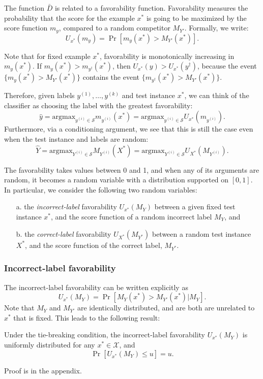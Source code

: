 \documentclass[twoside,11pt]{article}
\newcommand{\argmax}{\text{argmax}}
\begin{document}
The function $\bar{D}$ is related to a favorability function. Favorability measures the probability that the score for 
the example $x^*$ is going to be maximized by the score function $m_y$, compared to a random competitor $M_{Y'}$. 
Formally, we write:
\begin{equation}\label{eq:U_function}
U_{x^*}(m_{y}) = \Pr[m_{y}(x^*) > M_{Y'}(x^*)].
\end{equation}

Note that for fixed example $x^*$, favorability is monotonically increasing in $m_{y}(x^*)$.  If $m_y(x^*) > m_{y^\dagger}(x^*)$, then $U_{x^*}(y) > U_{x^*}(y^\dagger)$, because the event $\{m_{y}(x^*) > M_{Y'}(x^*)\}$ contains the event $\{m_{y^\dagger}(x^*) > M_{Y'}(x^*)\}$.

Therefore, given labels $y^{(1)},\hdots,y^{(k)}$ and test instance $x^*$,
we can think of the classifier as choosing the label with the greatest favorability:
\[
\hat{y} = \argmax_{y^{(i)} \in \mathcal{S}} m_{y^{(i)}}(x^*) = \argmax_{y^{(i)} \in \mathcal{S}} U_{x^*}(m_{y^{(i)}}).
\]
Furthermore, via a conditioning argument, we see that this is still the case even when the test instance and labels are random:
\[
\hat{Y} = \argmax_{Y^{(i)} \in \mathcal{S}} M_{Y^{(i)}}(X^*) = \argmax_{Y^{(i)} \in \mathcal{S}} U_{X^*}(M_{Y^{(i)}}).
\]


The favorability takes values between 0 and 1, and when any of its arguments are random, it becomes a random variable with a distribution supported on $[0,1]$.
In particular, we consider the following two random variables:
\begin{itemize}
\item[a.] the \emph{incorrect-label} favorability $U_{x^*}(M_Y)$ between a given fixed test instance $x^*$, and the score function of a random incorrect label $M_{Y}$, and
\item[b.] the \emph{correct-label} favorability $U_{X^*}(M_{Y^*})$ between a random test instance $X^*$, and the score function of the correct label, $M_{Y^*}$.
\end{itemize}
\subsubsection{Incorrect-label favorability}
The incorrect-label favorability can be written explicitly as 
\begin{equation}
U_{x^*}(M_Y) = \Pr[M_{Y}(x^*) > M_{Y'}(x^*)|M_{Y}].
\end{equation}
Note that $M_Y$ and $M_{Y'}$ are identically distributed, and are both are unrelated to $x^*$ that is fixed. This leads to the following result: 
\begin{lemma}\label{lemma:U_function}
Under the tie-breaking condition, the incorrect-label favorability $U_{x^*}(M_Y)$ is uniformly distributed for any $x^* \in \mathcal{X}$, and \begin{equation}\label{eq:Uniform}
\Pr[U_{x^*}(M_Y) \leq u] = u.
\end{equation}
\end{lemma}
Proof is in the appendix. 
\end{document}
